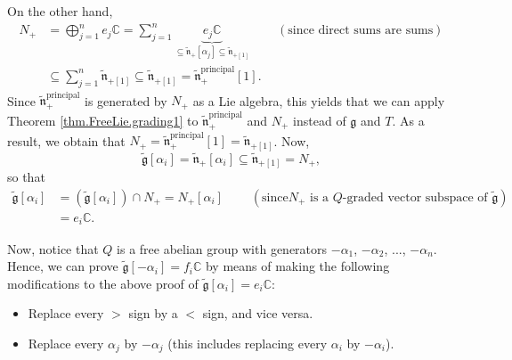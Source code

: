 \documentclass[etingof-lie.tex]{subfiles}
\begin{document}
\begin{verlong}
On the other hand,%
\begin{align*}
N_{+}  &  =\bigoplus\limits_{j=1}^{n}e_{j}\mathbb{C}=\sum\limits_{j=1}%
^{n}\underbrace{e_{j}\mathbb{C}}_{\subseteq\widetilde{\mathfrak{n}}_{+}\left[
\alpha_{j}\right]  \subseteq\widetilde{\mathfrak{n}}_{+\left[  1\right]  }%
}\ \ \ \ \ \ \ \ \ \ \left(  \text{since direct sums are sums}\right) \\
&  \subseteq\sum\limits_{j=1}^{n}\widetilde{\mathfrak{n}}_{+\left[  1\right]
}\subseteq\widetilde{\mathfrak{n}}_{+\left[  1\right]  }%
=\widetilde{\mathfrak{n}}_{+}^{\operatorname*{principal}}\left[  1\right]  .
\end{align*}
Since $\widetilde{\mathfrak{n}}_{+}^{\operatorname*{principal}}$ is generated
by $N_{+}$ as a Lie algebra, this yields that we can apply Theorem
\ref{thm.FreeLie.grading1} to $\widetilde{\mathfrak{n}}_{+}%
^{\operatorname*{principal}}$ and $N_{+}$ instead of $\mathfrak{g}$ and $T$.
As a result, we obtain that $N_{+}=\widetilde{\mathfrak{n}}_{+}%
^{\operatorname*{principal}}\left[  1\right]  =\widetilde{\mathfrak{n}%
}_{+\left[  1\right]  }$. Now,%
\[
\widetilde{\mathfrak{g}}\left[  \alpha_{i}\right]  =\widetilde{\mathfrak{n}%
}_{+}\left[  \alpha_{i}\right]  \subseteq\widetilde{\mathfrak{n}}_{+\left[
1\right]  }=N_{+},
\]
so that%
\begin{align*}
\widetilde{\mathfrak{g}}\left[  \alpha_{i}\right]   &  =\left(
\widetilde{\mathfrak{g}}\left[  \alpha_{i}\right]  \right)  \cap N_{+}%
=N_{+}\left[  \alpha_{i}\right]  \ \ \ \ \ \ \ \ \ \ \left(  \text{since
}N_{+}\text{ is a }Q\text{-graded vector subspace of }\widetilde{\mathfrak{g}%
}\right) \\
&  =e_{i}\mathbb{C}.
\end{align*}


Now, notice that $Q$ is a free abelian group with generators $-\alpha_{1}$,
$-\alpha_{2}$, $...$, $-\alpha_{n}$. Hence, we can prove
$\widetilde{\mathfrak{g}}\left[  -\alpha_{i}\right]  =f_{i}\mathbb{C}$ by
means of making the following modifications to the above proof of
$\widetilde{\mathfrak{g}}\left[  \alpha_{i}\right]  =e_{i}\mathbb{C}$:

\begin{itemize}
\item Replace every $>$ sign by a $<$ sign, and vice versa.

\item Replace every $\alpha_{j}$ by $-\alpha_{j}$ (this includes replacing
every $\alpha_{i}$ by $-\alpha_{i}$).


\end{itemize}
\end{verlong}
\end{document}
